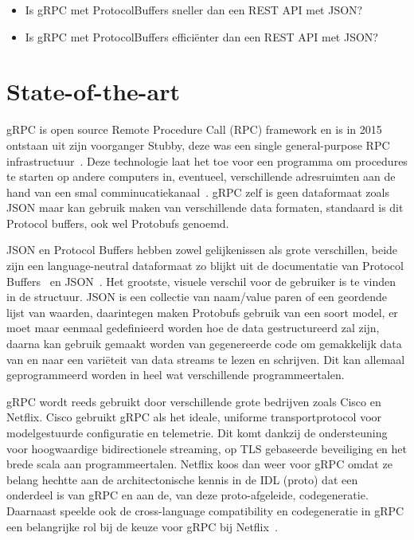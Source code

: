 \begin{itemize}
  \item Is gRPC met ProtocolBuffers sneller dan een REST API met JSON?
  \item Is gRPC met ProtocolBuffers efficiënter dan een REST API met JSON?
\end{itemize}


\section{State-of-the-art}
\label{sec:state-of-the-art}
gRPC is open source Remote Procedure Call (RPC) framework en is in 2015 ontstaan uit zijn voorganger Stubby, deze was een single general-purpose RPC infrastructuur~\autocite{gRPC}. Deze technologie laat het toe voor een programma om procedures te starten op andere computers in, eventueel, verschillende adresruimten aan de hand van een smal comminucatiekanaal~\autocite{Nelson1981}. gRPC zelf is geen dataformaat zoals JSON maar kan gebruik maken van verschillende data formaten, standaard is dit Protocol buffers, ook wel Protobufs genoemd.

JSON en Protocol Buffers hebben zowel gelijkenissen als grote verschillen, beide zijn een language-neutral dataformaat zo blijkt uit de documentatie van Protocol Buffers~\autocite{Google} en  JSON~\autocite{Json2017}. Het grootste, visuele verschil voor de gebruiker is te vinden in de structuur. JSON is een collectie van naam/value paren of een geordende lijst van waarden, daarintegen maken Protobufs gebruik van een soort model, er moet maar eenmaal gedefinieerd worden hoe de data gestructureerd zal zijn, daarna kan gebruik gemaakt worden van gegenereerde code om gemakkelijk data van en naar een variëteit van data streams te lezen en schrijven. Dit kan allemaal geprogrammeerd worden in heel wat verschillende programmeertalen.

gRPC wordt reeds gebruikt door verschillende grote bedrijven zoals Cisco en Netflix. 
Cisco gebruikt gRPC als het ideale, uniforme transportprotocol voor modelgestuurde configuratie en telemetrie. Dit komt dankzij de ondersteuning voor hoogwaardige bidirectionele streaming, op TLS gebaseerde beveiliging en het brede scala aan programmeertalen. 
Netflix koos dan weer voor gRPC omdat ze belang hechtte aan de architectonische kennis in de IDL (proto) dat een onderdeel is van gRPC en aan de, van deze proto-afgeleide, codegeneratie. Daarnaast speelde ook de cross-language compatibility en codegeneratie in gRPC een belangrijke rol bij de keuze voor gRPC bij Netflix~\autocite{Foundation2018}.

